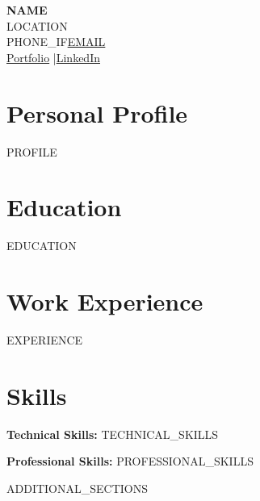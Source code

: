 \documentclass[11pt,a4paper]{article}
\begin{document}
\begin{center}
    {\LARGE\bfseries {{NAME}}}\\[4pt]
    {{LOCATION}}\\[2pt]
    {{PHONE_IF}}\href{mailto:{{EMAIL}}}{{{EMAIL}}}\\[2pt]
    \href{{{PORTFOLIO}}}{Portfolio} \quad|\quad \href{{{LINKEDIN}}}{LinkedIn}
\end{center}

\vspace{6pt}

\section{Personal Profile}
{{PROFILE}}

\section{Education}
{{EDUCATION}}

\section{Work Experience}
{{EXPERIENCE}}

\section{Skills}
\textbf{Technical Skills:} {{TECHNICAL_SKILLS}}

\vspace{4pt}
\textbf{Professional Skills:} {{PROFESSIONAL_SKILLS}}

{{ADDITIONAL_SECTIONS}}
\end{document}

